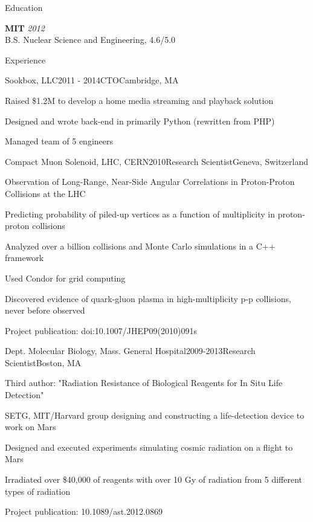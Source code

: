 \documentclass{resume}
\begin{document}

\begin{rSection}{Education}

{\bf MIT} \hfill {\em 2012} \\ 
B.S. Nuclear Science and Engineering, 4.6/5.0

\end{rSection}


\begin{rSection}{Experience}

\begin{rSubsection}{Sookbox, LLC}{2011 - 2014}{CTO}{Cambridge, MA}
\item Raised \$1.2M to develop a home media streaming and playback solution
\item Designed and wrote back-end in primarily Python (rewritten from PHP)
\item Managed team of 5 engineers
\end{rSubsection}

\begin{rSubsection}{Compact Muon Solenoid, LHC, CERN}{2010}{Research Scientist}{Geneva, Switzerland}
\item Observation of Long-Range, Near-Side Angular Correlations in Proton-Proton Collisions at the LHC
\item Predicting probability of piled-up vertices as a function of multiplicity in proton-proton collisions
\item Analyzed over a billion collisions and Monte Carlo simulations in a C++ framework
\item Used Condor for grid computing
\item Discovered evidence of quark-gluon plasma in high-multiplicity p-p collisions, never before observed
\item Project publication: doi:10.1007/JHEP09(2010)091s
\end{rSubsection}


\begin{rSubsection}{Dept. Molecular Biology, Mass. General Hospital}{2009-2013}{Research Scientist}{Boston, MA}
\item Third author: "Radiation Resistance of Biological Reagents for In Situ Life Detection"
\item SETG, MIT/Harvard group designing and constructing a life-detection device to work on Mars
\item Designed and executed experiments simulating cosmic radiation on a flight to Mars
\item Irradiated over \$40,000 of reagents with over 10 Gy of radiation from 5 different types of radiation
\item Project publication: 10.1089/ast.2012.0869
\end{rSubsection}



\end{rSection}
\end{document}
